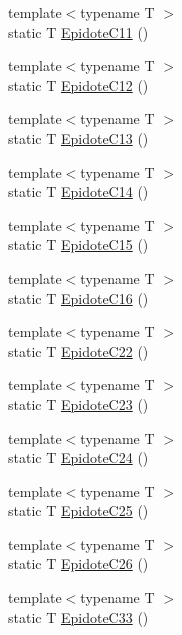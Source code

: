 \begin{DoxyCompactItemize}
\item 
{\footnotesize template$<$typename T $>$ }\\static T \mbox{\hyperlink{namespacempc_1_1data_a71d1ac2dc7f940dfc38c9dfef0a31ff9}{Epidote\+C11}} ()
\item 
{\footnotesize template$<$typename T $>$ }\\static T \mbox{\hyperlink{namespacempc_1_1data_a1d13cf3e4bf95e89f732485f97ef30f2}{Epidote\+C12}} ()
\item 
{\footnotesize template$<$typename T $>$ }\\static T \mbox{\hyperlink{namespacempc_1_1data_ac1c2f272a278696d7ffecfa112c59774}{Epidote\+C13}} ()
\item 
{\footnotesize template$<$typename T $>$ }\\static T \mbox{\hyperlink{namespacempc_1_1data_a32738568652398c4127fe3f99df0a3c0}{Epidote\+C14}} ()
\item 
{\footnotesize template$<$typename T $>$ }\\static T \mbox{\hyperlink{namespacempc_1_1data_ae2a0d3835d6cb4ea81d002370b8a8d1d}{Epidote\+C15}} ()
\item 
{\footnotesize template$<$typename T $>$ }\\static T \mbox{\hyperlink{namespacempc_1_1data_a56a1f8623ec5d3f321c0bf3b05b3a082}{Epidote\+C16}} ()
\item 
{\footnotesize template$<$typename T $>$ }\\static T \mbox{\hyperlink{namespacempc_1_1data_a9295968c9145b32c656ebd8809569f30}{Epidote\+C22}} ()
\item 
{\footnotesize template$<$typename T $>$ }\\static T \mbox{\hyperlink{namespacempc_1_1data_aadc3457fd822a04dfaec53019ec1f3c4}{Epidote\+C23}} ()
\item 
{\footnotesize template$<$typename T $>$ }\\static T \mbox{\hyperlink{namespacempc_1_1data_ae1781b55f53a8853226d8f1c21f30965}{Epidote\+C24}} ()
\item 
{\footnotesize template$<$typename T $>$ }\\static T \mbox{\hyperlink{namespacempc_1_1data_a6ee4a451bed5b2584307f95aaad55736}{Epidote\+C25}} ()
\item 
{\footnotesize template$<$typename T $>$ }\\static T \mbox{\hyperlink{namespacempc_1_1data_acf774b2a250a7deb1199844c0ef35ea4}{Epidote\+C26}} ()
\item 
{\footnotesize template$<$typename T $>$ }\\static T \mbox{\hyperlink{namespacempc_1_1data_a1312eff0ffffc3bcdda6922338f28218}{Epidote\+C33}} ()

\end{DoxyCompactItemize}
